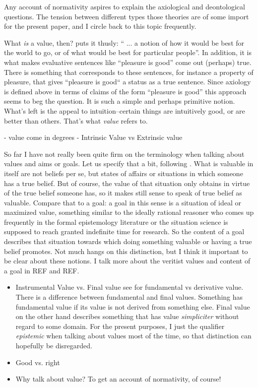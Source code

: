 \documentclass[12pt,numbers=noenddot]{scrartcl}
\begin{document}
Any account of normativity aspires to explain the axiological and deontological questions. The tension between different types those theories are of some import for the present paper, and I circle back to this topic frequently.

What \emph{is} a value, then? \textcite[79]{scanlon1998} puts it thusly: “ ... a notion of how it would be best for the world to go, or of what would be best for particular people”. In addition, it is what makes evaluative sentences like “pleasure is good” come out (perhaps) true. There is something that corresponds to these sentences, for instance a property of pleasure, that gives “pleasure is good“ a status as a true sentence. Since axiology is defined above in terms of claims of the form “pleasure is good” this approach seems to beg the question. It is such a simple and perhaps primitive notion. What's left is the appeal to intuition–certain things are intuitively good, or are better than others. That's what \emph{value} refers to.

- value come in degrees
- Intrinsic Value vs Extrinsic value

So far I have not really been quite firm on the terminology when talking about values and aims or goals. Let us specify that a bit, following \textcite[344f.]{Berker2013-BERETA-2}. What is valuable in itself are not beliefs per se, but states of affairs or situations in which someone has a true belief. But of course, the value of that situation only obtains in virtue of the true belief someone has, so it makes still sense to speak of true belief as valuable. Compare that to a goal: a goal in this sense is a situation of ideal or maximized value, something similar to the ideally rational reasoner who comes up frequently in the formal epistemology literature or the situation science is supposed to reach granted indefinite time for research. So the content of a goal describes that situation towards which doing something valuable or having a true belief promotes. Not much hangs on this distinction, but I think it important to be clear about these notions. I talk more about the veritist values and content of a goal in REF and REF.
\begin{itemize}
    \item{ Instrumental Value vs. Final value }
    see \textcite{Sosa2007-SOSAVE-2} for fundamental vs derivative value. There is a difference between fundamental and final values. Something has fundamental value if its value is not derived from something else. Final value on the other hand describes something that has value \emph{simpliciter} without regard to some domain. For the present purposes, I just the qualifier \emph{epistemic} when talking about values most of the time, so that distinction can hopefully be disregarded.
    \item{ Good vs. right }
    \item{ Why talk about value? To get an account of normativity, of course! }
\end{itemize}
\end{document}
